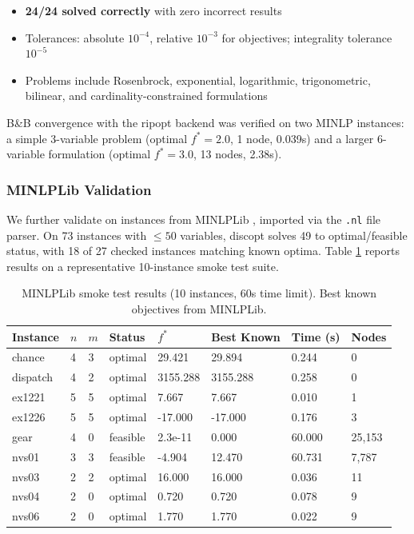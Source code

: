 \documentclass[12pt,preprint]{article}
\begin{document}
\begin{itemize}
\item \textbf{24/24 solved correctly} with zero incorrect results

\item Tolerances: absolute $10^{-4}$, relative $10^{-3}$ for objectives; integrality tolerance $10^{-5}$

\item Problems include Rosenbrock, exponential, logarithmic, trigonometric, bilinear, and cardinality-constrained formulations

\end{itemize}


B\&B convergence with the ripopt backend was verified on two MINLP instances: a simple 3-variable problem (optimal $f^* = 2.0$, 1 node, 0.039s) and a larger 6-variable formulation (optimal $f^* = 3.0$, 13 nodes, 2.38s).

\subsubsection{MINLPLib Validation}
\label{org-minlplib-validation}
We further validate on instances from MINLPLib \cite{Bussieck2003}, imported via the \texttt{.nl} file parser. On 73 instances with $\le 50$ variables, discopt solves 49 to optimal/feasible status, with 18 of 27 checked instances matching known optima. Table \ref{tab-minlplib} reports results on a representative 10-instance smoke test suite.


\begin{table}[htbp]
\centering
\begin{tabular}{llllllll}
\toprule
Instance & $n$ & $m$ & Status & $f^*$ & Best Known & Time (s) & Nodes \\
\midrule
chance & 4 & 3 & optimal & 29.421 & 29.894 & 0.244 & 0 \\
dispatch & 4 & 2 & optimal & 3155.288 & 3155.288 & 0.258 & 0 \\
ex1221 & 5 & 5 & optimal & 7.667 & 7.667 & 0.010 & 1 \\
ex1226 & 5 & 5 & optimal & -17.000 & -17.000 & 0.176 & 3 \\
gear & 4 & 0 & feasible & 2.3e-11 & 0.000 & 60.000 & 25,153 \\
nvs01 & 3 & 3 & feasible & -4.904 & 12.470 & 60.731 & 7,787 \\
nvs03 & 2 & 2 & optimal & 16.000 & 16.000 & 0.036 & 11 \\
nvs04 & 2 & 0 & optimal & 0.720 & 0.720 & 0.078 & 9 \\
nvs06 & 2 & 0 & optimal & 1.770 & 1.770 & 0.022 & 9 \\
\bottomrule
\end{tabular}
\caption{MINLPLib smoke test results (10 instances, 60s time limit). Best known objectives from MINLPLib.}
\label{tab-minlplib}
\end{table}
\end{document}
